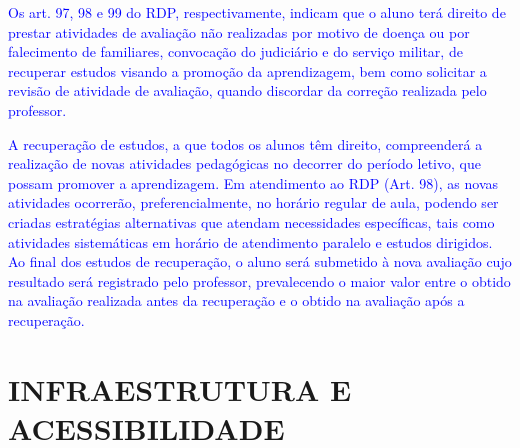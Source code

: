 \documentclass{../../modelos/latex-shared/ifsc-ppc}
\newcommand{\revisao}[1]{\textcolor{blue}{#1}}
\newcommand{\revisao}[1]{#1}
\begin{document}
\revisao{Os art. 97, 98 e 99 do RDP, respectivamente, indicam que o aluno terá direito de prestar atividades de avaliação não realizadas por motivo de doença ou por falecimento de familiares, convocação do judiciário e do serviço militar, de recuperar estudos visando a promoção da aprendizagem, bem como solicitar a revisão de atividade de avaliação, quando discordar da correção realizada pelo professor.}

\revisao{A recuperação de estudos, a que todos os alunos têm direito, compreenderá a realização de novas atividades pedagógicas no decorrer do período letivo, que possam promover a aprendizagem. Em atendimento ao RDP (Art. 98), as novas atividades ocorrerão, preferencialmente, no horário regular de aula, podendo ser criadas estratégias alternativas que atendam necessidades específicas, tais como atividades sistemáticas em horário de atendimento paralelo e estudos dirigidos. Ao final dos estudos de recuperação, o aluno será submetido à nova avaliação cujo resultado será registrado pelo professor, prevalecendo o maior valor entre o obtido na avaliação realizada antes da recuperação e o obtido na avaliação após a recuperação.}

\section{INFRAESTRUTURA E ACESSIBILIDADE}
\end{document}
